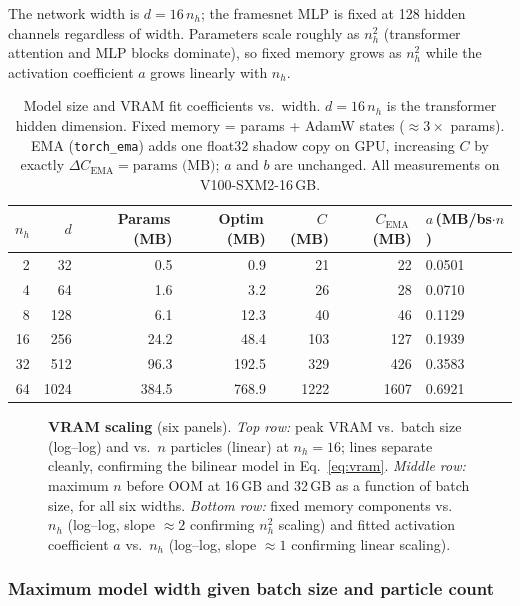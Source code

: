 The network width is $d = 16\,n_h$; the framesnet MLP is fixed at
128 hidden channels regardless of width.  Parameters scale roughly
as $n_h^2$ (transformer attention and MLP blocks dominate), so fixed
memory grows as $n_h^2$ while the activation coefficient $a$ grows
linearly with $n_h$.

\begin{table}[h]
\centering
\caption{%
  Model size and VRAM fit coefficients vs.\ width.
  $d = 16\,n_h$ is the transformer hidden dimension.
  Fixed memory = params + AdamW states ($\approx 3\times$ params).
  EMA (\texttt{torch\_ema}) adds one float32 shadow copy on GPU,
  increasing $C$ by exactly $\Delta C_\text{EMA} = \text{params (MB)}$;
  $a$ and $b$ are unchanged.
  All measurements on V100-SXM2-16\,GB.}
\label{tab:width}
\begin{tabular}{rrrrrrl}
\hline
$n_h$ & $d$ & Params\,(MB) & Optim\,(MB) & $C$\,(MB) & $C_\text{EMA}$\,(MB) & $a$\,(MB/bs$\cdot n$) \\
\hline
  2 &   32 &   0.5 &   0.9 &   21 &   22 & 0.0501 \\
  4 &   64 &   1.6 &   3.2 &   26 &   28 & 0.0710 \\
  8 &  128 &   6.1 &  12.3 &   40 &   46 & 0.1129 \\
 16 &  256 &  24.2 &  48.4 &  103 &  127 & 0.1939 \\
 32 &  512 &  96.3 & 192.5 &  329 &  426 & 0.3583 \\
 64 & 1024 & 384.5 & 768.9 & 1222 & 1607 & 0.6921 \\
\hline
\end{tabular}
\end{table}

\begin{figure}[h]
  \centering
  \caption{%
    \textbf{VRAM scaling} (six panels).
    \textit{Top row:} peak VRAM vs.\ batch size (log--log) and vs.\
    $n$ particles (linear) at $n_h=16$; lines separate cleanly,
    confirming the bilinear model in Eq.~\eqref{eq:vram}.
    \textit{Middle row:} maximum $n$ before OOM at 16\,GB and 32\,GB
    as a function of batch size, for all six widths.
    \textit{Bottom row:} fixed memory components vs.\ $n_h$ (log--log,
    slope $\approx 2$ confirming $n_h^2$ scaling) and fitted
    activation coefficient $a$ vs.\ $n_h$ (log--log, slope $\approx 1$
    confirming linear scaling).}
  \label{fig:vram}
\end{figure}

\subsubsection{Maximum model width given batch size and particle count}

